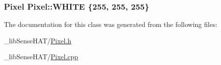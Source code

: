 \subsubsection[{\texorpdfstring{W\+H\+I\+TE}{WHITE}}]{ {\bf Pixel} Pixel\+::\+W\+H\+I\+TE \{255, 255, 255\}\hspace{0.3cm}{\ttfamily [static]}}\hypertarget{class_pixel_a12c08beec64c8d57bdd9ef3b49244aa3}{}\label{class_pixel_a12c08beec64c8d57bdd9ef3b49244aa3}


The documentation for this class was generated from the following files\+:\begin{DoxyCompactItemize}
\item 
\+\_\+lib\+Sense\+H\+A\+T/\hyperlink{_pixel_8h}{Pixel.\+h}\item 
\+\_\+lib\+Sense\+H\+A\+T/\hyperlink{_pixel_8cpp}{Pixel.\+cpp}\end{DoxyCompactItemize}
